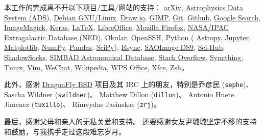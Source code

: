 \begin{thanks}
本工作的完成离不开以下项目/工具/网站的支持：
\href{https://arxiv.org/}{arXiv},
\href{http://ads.harvard.edu/}{Astrophysics Data System (ADS)},
\href{https://www.debian.org/}{Debian GNU/Linux},
\href{https://www.draw.io/}{Draw.io},
\href{https://www.gimp.org/}{GIMP},
\href{https://git-scm.com/}{Git},
\href{https://github.com/}{Github},
\href{https://www.google.com/}{Google Search},
\href{https://imagemagick.org/}{ImageMagick},
\href{https://keras.io/}{Keras},
\href{https://www.latex-project.org/}{\LaTeX},
\href{https://www.libreoffice.org/}{LibreOffice},
\href{https://www.mozilla.org/en-US/firefox/}{Mozilla Firefox},
\href{https://ned.ipac.caltech.edu/}{NASA/IPAC Extragalactic Database (NED)},
\href{https://okular.kde.org/}{Okular},
\href{https://www.openssh.com/}{OpenSSH},
\href{https://www.python.org/}{Python} (%
\href{https://www.astropy.org/}{Astropy},
\href{https://jupyter.org/}{Jupyter},
\href{https://matplotlib.org/}{Matplotlib},
\href{https://www.numpy.org/}{NumPy},
\href{https://pandas.pydata.org/}{Pandas},
\href{https://scipy.org/}{SciPy}),
\href{https://rsync.samba.org/}{Rsync},
\href{http://ds9.si.edu/}{SAOImage DS9},
\href{https://sci-hub.tw/}{Sci-Hub},
\href{https://shadowsocks.org/}{ShadowSocks},
\href{http://simbad.u-strasbg.fr/simbad/}{SIMBAD Astronomical Database},
\href{https://stackoverflow.com/}{Stack Overflow},
\href{https://syncthing.net/}{Syncthing},
\href{https://github.com/tmux/tmux}{Tmux},
\href{https://www.vim.org/}{Vim},
\href{https://www.wechat.com/}{WeChat},
\href{https://www.wikipedia.org/}{Wikipedia},
\href{http://wps-community.org/}{WPS Office},
\href{https://www.xfce.org/}{Xfce},
\href{http://www.zsh.org/}{Zsh}。

此外，感谢 \href{https://www.dragonflybsd.org/}{DragonFly BSD}
项目及其 IRC 上的朋友，特别是乔彦民 (\texttt{sephe})、
Sascha Wildner (\texttt{swildner})、
Matthew Dillon (\texttt{dillon})、
Antonio Huete Jimenez (\texttt{tuxillo})、
Rimvydas Jasinskas (\texttt{zrj})。

最后，感谢父母和亲人的无私关爱和支持。
还要感谢女友尹璐璐坚定不移的支持和鼓励，与我携手走过这段难忘岁月。

\end{thanks}
